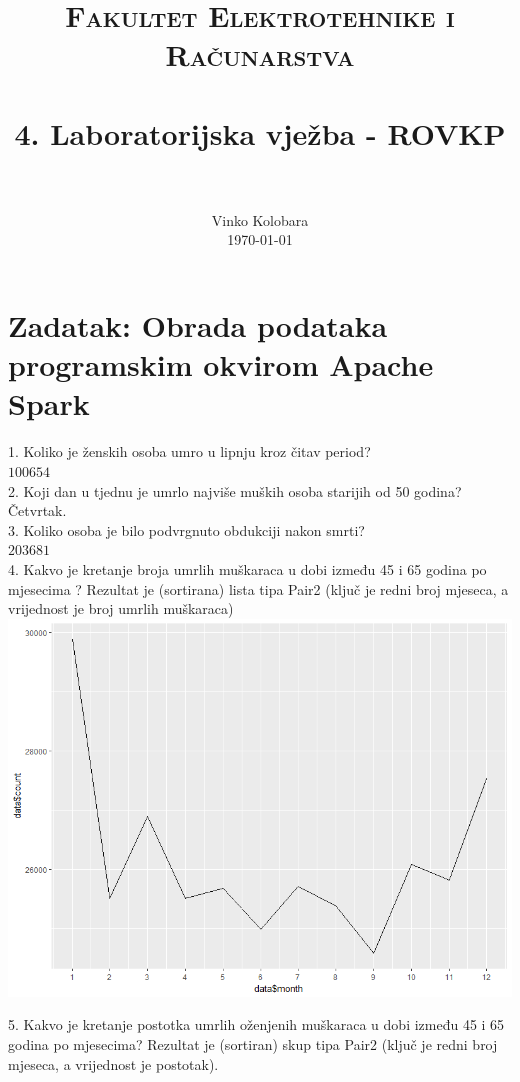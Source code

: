 \documentclass[paper=a4, fontsize=11pt]{scrartcl}
\title{
		\usefont{OT1}{bch}{b}{n}
		\normalfont \normalsize \textsc{Fakultet Elektrotehnike i Računarstva} \\ [25pt]
		\horrule{0.5pt} \\[0.4cm]
		\huge 4. Laboratorijska vježba - ROVKP \\
		\horrule{2pt} \\[0.5cm]
}
\author{
		\normalfont 								\normalsize
        Vinko Kolobara\\[-3pt]		\normalsize
        \today
}
\date{}
\numberwithin{equation}{section}		%
\numberwithin{figure}{section}			%
\numberwithin{table}{section}				%
\begin{document}
\maketitle

\section{Zadatak: Obrada podataka programskim okvirom Apache Spark}
1. Koliko je ženskih osoba umro u lipnju kroz čitav period?\\
$100654$\\

2. Koji dan u tjednu je umrlo najviše muških osoba starijih od 50 godina?\\
Četvrtak.\\

3. Koliko osoba je bilo podvrgnuto obdukciji nakon smrti?\\
$203681$\\

4. Kakvo je kretanje broja umrlih muškaraca u dobi između 45 i 65 godina po mjesecima ? Rezultat je (sortirana) lista tipa Pair2 (ključ je redni broj mjeseca, a vrijednost je broj umrlih muškaraca)\\

\includegraphics[width=\textwidth]{deadMales.png}

5. Kakvo je kretanje postotka umrlih oženjenih muškaraca u dobi između 45 i 65 godina po mjesecima? Rezultat je (sortiran) skup tipa Pair2 (ključ je redni broj mjeseca, a vrijednost je postotak). \\
\end{document}
